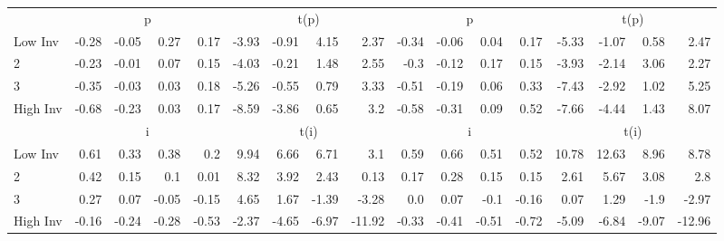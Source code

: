 \begin{table}[!ht]
\begin{tabular}{lrrrrrrrrrrrrrrrr}
  
    
      & \multicolumn{4}{c}{p} & \multicolumn{4}{c}{t(p)}
    
      & \multicolumn{4}{c}{p} & \multicolumn{4}{c}{t(p)}
    
    \\
      \cmidrule(r){2-5} \cmidrule(r){6-9} \cmidrule(r){10-13} \cmidrule(r){14-17}

    Low Inv   & -0.28  & -0.05  & 0.27  & 0.17  & -3.93  & -0.91  & 4.15  & 2.37  & -0.34  & -0.06  & 0.04  & 0.17  & -5.33  & -1.07  & 0.58  & 2.47  \\
           2  & -0.23  & -0.01  & 0.07  & 0.15  & -4.03  & -0.21  & 1.48  & 2.55  & -0.3  & -0.12  & 0.17  & 0.15  & -3.93  & -2.14  & 3.06  & 2.27  \\
           3  & -0.35  & -0.03  & 0.03  & 0.18  & -5.26  & -0.55  & 0.79  & 3.33  & -0.51  & -0.19  & 0.06  & 0.33  & -7.43  & -2.92  & 1.02  & 5.25  \\
    High Inv  & -0.68  & -0.23  & 0.03  & 0.17  & -8.59  & -3.86  & 0.65  & 3.2  & -0.58  & -0.31  & 0.09  & 0.52  & -7.66  & -4.44  & 1.43  & 8.07  \\

  
    
      & \multicolumn{4}{c}{i} & \multicolumn{4}{c}{t(i)}
    
      & \multicolumn{4}{c}{i} & \multicolumn{4}{c}{t(i)}
    
    \\
      \cmidrule(r){2-5} \cmidrule(r){6-9} \cmidrule(r){10-13} \cmidrule(r){14-17}

    Low Inv   & 0.61  & 0.33  & 0.38  & 0.2  & 9.94  & 6.66  & 6.71  & 3.1  & 0.59  & 0.66  & 0.51  & 0.52  & 10.78  & 12.63  & 8.96  & 8.78  \\
           2  & 0.42  & 0.15  & 0.1  & 0.01  & 8.32  & 3.92  & 2.43  & 0.13  & 0.17  & 0.28  & 0.15  & 0.15  & 2.61  & 5.67  & 3.08  & 2.8  \\
           3  & 0.27  & 0.07  & -0.05  & -0.15  & 4.65  & 1.67  & -1.39  & -3.28  & 0.0  & 0.07  & -0.1  & -0.16  & 0.07  & 1.29  & -1.9  & -2.97  \\
    High Inv  & -0.16  & -0.24  & -0.28  & -0.53  & -2.37  & -4.65  & -6.97  & -11.92  & -0.33  & -0.41  & -0.51  & -0.72  & -5.09  & -6.84  & -9.07  & -12.96  \\

  

  \bottomrule
\end{tabular}
\label{tbl:32_Size_OP_Inv_FF2016b}
\end{table}